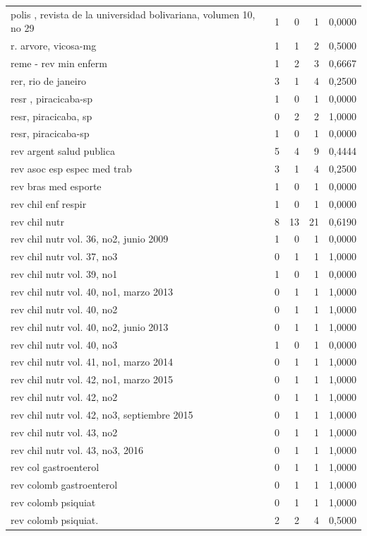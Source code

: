 \begin{longtable}{lrrrr}
polis , revista de la universidad bolivariana, volumen 10, no 29 & 1 & 0 & 1 & 0,0000\\
r. arvore, vicosa-mg & 1 & 1 & 2 & 0,5000\\
reme - rev min enferm & 1 & 2 & 3 & 0,6667\\
rer, rio de janeiro & 3 & 1 & 4 & 0,2500\\
resr , piracicaba-sp & 1 & 0 & 1 & 0,0000\\
resr, piracicaba, sp & 0 & 2 & 2 & 1,0000\\
resr, piracicaba-sp & 1 & 0 & 1 & 0,0000\\
rev argent salud publica & 5 & 4 & 9 & 0,4444\\
rev asoc esp espec med trab & 3 & 1 & 4 & 0,2500\\
rev bras med esporte & 1 & 0 & 1 & 0,0000\\
rev chil enf respir & 1 & 0 & 1 & 0,0000\\
rev chil nutr & 8 & 13 & 21 & 0,6190\\
rev chil nutr vol. 36, no2, junio 2009 & 1 & 0 & 1 & 0,0000\\
rev chil nutr vol. 37, no3 & 0 & 1 & 1 & 1,0000\\
rev chil nutr vol. 39, no1 & 1 & 0 & 1 & 0,0000\\
rev chil nutr vol. 40, no1, marzo 2013 & 0 & 1 & 1 & 1,0000\\
rev chil nutr vol. 40, no2 & 0 & 1 & 1 & 1,0000\\
rev chil nutr vol. 40, no2, junio 2013 & 0 & 1 & 1 & 1,0000\\
rev chil nutr vol. 40, no3 & 1 & 0 & 1 & 0,0000\\
rev chil nutr vol. 41, no1, marzo 2014 & 0 & 1 & 1 & 1,0000\\
rev chil nutr vol. 42, no1, marzo 2015 & 0 & 1 & 1 & 1,0000\\
rev chil nutr vol. 42, no2 & 0 & 1 & 1 & 1,0000\\
rev chil nutr vol. 42, no3, septiembre 2015 & 0 & 1 & 1 & 1,0000\\
rev chil nutr vol. 43, no2 & 0 & 1 & 1 & 1,0000\\
rev chil nutr vol. 43, no3, 2016 & 0 & 1 & 1 & 1,0000\\
rev col gastroenterol & 0 & 1 & 1 & 1,0000\\
rev colomb gastroenterol & 0 & 1 & 1 & 1,0000\\
rev colomb psiquiat & 0 & 1 & 1 & 1,0000\\
rev colomb psiquiat. & 2 & 2 & 4 & 0,5000\\

\end{longtable}
